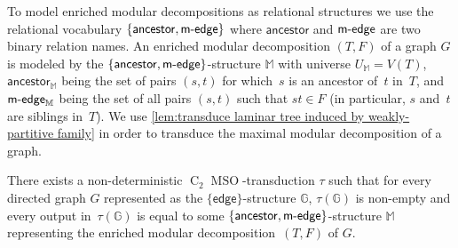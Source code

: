 \documentclass{lmcs} %
\newcommand{\MSO}{\ensuremath{\operatorname{MSO}}\xspace}
\newcommand{\CMSO}[1][]{\ensuremath{\C[#1]{\!\!}\MSO}\xspace}
\newcommand{\C}[1][]{\ensuremath{\operatorname{C}_{#1}}\xspace}
\newcommand{\ancestor}{\mathsf{ancestor}}
\newcommand{\edge}{\ensuremath{\mathsf{edge}}\xspace}
\newcommand{\medge}{\ensuremath{\textsf{m}\text-\mathsf{edge}}\xspace}
\begin{document}
To model enriched modular decompositions as relational structures
we use the relational vocabulary $\{\ancestor, \medge\}$
where $\ancestor$ and $\medge$ are two binary relation names.
An enriched modular decomposition $(T,F)$ of a graph $G$
is modeled by the {$\{\ancestor, \medge\}$}-structure $\mathbb{M}$
with universe $U_{\mathbb{M}}=V(T)$,
$\ancestor_{\mathbb{M}}$ being the set of pairs $(s,t)$
for which~$s$ is an ancestor of~$t$ in~$T$,
and $\medge_{\mathbb{M}}$ being the set of all pairs $(s,t)$
such that $st\in F$
(in particular, $s$ and~$t$ are siblings in~$T$).
%
We use \autoref{lem:transduce laminar tree induced by weakly-partitive family}
in order to transduce the maximal modular decomposition of a graph.
\begin{thm}
    \label{thm:transduce modular decomposition}
    There exists a non-deterministic \CMSO[2]-transduction $\tau$
    such that for every directed graph $G$ represented as the $\{\edge\}$-structure $\mathbb{G}$,
    $\tau(\mathbb{G})$ is non-empty
    and every output in~$\tau(\mathbb{G})$ is equal to some $\{\ancestor,\medge\}$-structure $\mathbb{M}$
    representing the enriched modular decomposition~$(T,F)$ of $G$.
\end{thm}
\end{document}
